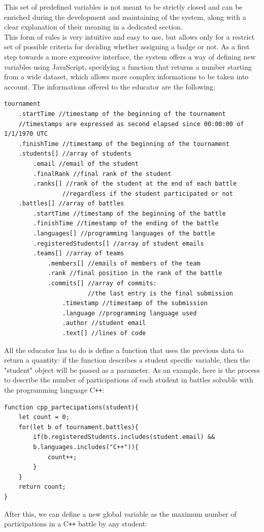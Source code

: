 This set of predefined variables is not meant to be strictly closed and can be enriched during the development and maintaining of the system, along with a clear explanation of their meaning in a dedicated section.
\\
This form of rules is very intuitive and easy to use, but allows only for a restrict set of possible criteria for deciding whether assigning a badge or not. As a first step towards a more expressive interface, the system offers a way of defining new variables using JavaScript, specifying a function that returns a number starting from a wide dataset, which allows more complex informations to be taken into account. The informations offered to the educator are the following:
\begin{verbatim}
tournament
    .startTime //timestamp of the beginning of the tournament
    //timestamps are expressed as second elapsed since 00:00:00 of 1/1/1970 UTC
    .finishTime //timestamp of the beginning of the tournament
    .students[] //array of students
        .email //email of the student
        .finalRank //final rank of the student
        .ranks[] //rank of the student at the end of each battle
                //regardless if the student participated or not
    .battles[] //array of battles
        .startTime //timestamp of the beginning of the battle
        .finishTime //timestamp of the ending of the battle
        .languages[] //programming languages of the battle
        .registeredStudents[] //array of student emails
        .teams[] //array of teams
            .members[] //emails of members of the team
            .rank //final position in the rank of the battle
            .commits[] //array of commits:
                       //the last entry is the final submission
                .timestamp //timestamp of the submission
                .language //programming language used
                .author //student email
                .text[] //lines of code
\end{verbatim}

All the educator has to do is define a function that uses the previous data to return a quantity: if the function describes a student specific variable, then the "student" object will be passed as a parameter. As an example, here is the process to describe the number of participations of each student in battles solvable with the programming language C\texttt{++}:

\begin{verbatim}
function cpp_partecipations(student){
    let count = 0;
    for(let b of tournament.battles){
        if(b.registeredStudents.includes(student.email) && 
        b.languages.includes("C++")){
            count++;
        }
    }
    return count;
}
\end{verbatim}
After this, we can define a new global variable as the maximum number of participations in a C\texttt{++} battle by any student:

